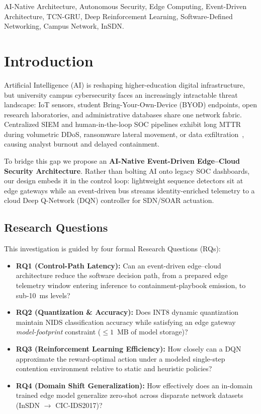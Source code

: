 \documentclass[conference,a4paper]{IEEEtran}
\begin{document}
\begin{IEEEkeywords}
AI-Native Architecture, Autonomous Security, Edge Computing, Event-Driven Architecture, TCN-GRU, Deep Reinforcement Learning, Software-Defined Networking, Campus Network, InSDN.
\end{IEEEkeywords}

\section{Introduction}
Artificial Intelligence (AI) is reshaping higher-education digital infrastructure, but university campus cybersecurity faces an increasingly intractable threat landscape: IoT sensors, student Bring-Your-Own-Device (BYOD) endpoints, open research laboratories, and administrative databases share one network fabric. Centralized SIEM and human-in-the-loop SOC pipelines exhibit long MTTR during volumetric DDoS, ransomware lateral movement, or data exfiltration~\cite{b4}, causing analyst burnout and delayed containment.

To bridge this gap we propose an \textbf{AI-Native Event-Driven Edge--Cloud Security Architecture}. Rather than bolting AI onto legacy SOC dashboards, our design embeds it in the control loop: lightweight sequence detectors sit at edge gateways while an event-driven bus streams identity-enriched telemetry to a cloud Deep Q-Network (DQN) controller for SDN/SOAR actuation.

\subsection{Research Questions}
This investigation is guided by four formal Research Questions (RQs):
\begin{itemize}
    \item \textbf{RQ1 (Control-Path Latency):} Can an event-driven edge--cloud architecture reduce the software decision path, from a prepared edge telemetry window entering inference to containment-playbook emission, to sub-10~ms levels?
    \item \textbf{RQ2 (Quantization \& Accuracy):} Does INT8 dynamic quantization maintain NIDS classification accuracy while satisfying an edge gateway \emph{model-footprint} constraint ($\le 1$~MB of model storage)?
    \item \textbf{RQ3 (Reinforcement Learning Efficiency):} How closely can a DQN approximate the reward-optimal action under a modeled single-step contention environment relative to static and heuristic policies?
    \item \textbf{RQ4 (Domain Shift Generalization):} How effectively does an in-domain trained edge model generalize zero-shot across disparate network datasets (InSDN $\rightarrow$ CIC-IDS2017)?
\end{itemize}
\end{document}
